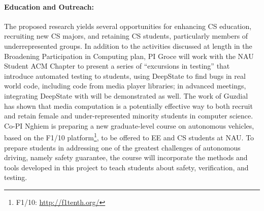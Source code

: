 \paragraph{Education and Outreach:}
The proposed research yields several opportunities for enhancing CS
education, recruiting new CS majors, and retaining CS students,
particularly members of underrepresented groups.  In addition to the
activities discussed at length in the Broadening Participation in Computing plan,
PI Groce will work with the NAU Student ACM Chapter to present a
series of ``excursions in testing'' that introduce automated testing
to students, using DeepState to find bugs in real world code, including code from
media player libraries; in advanced meetings, integrating DeepState
with \framac will be demonstrated as well.  The work of Guzdial
\cite{Guzdial} has shown that media computation is a
potentially effective way to both recruit and retain female and
under-represented minority students in computer science.
Co-PI Nghiem is preparing a new graduate-level course on autonomous vehicles, based on the F1/10 platform\footnote{F1/10: \url{http://f1tenth.org/}}, to be offered to EE and CS students at NAU.
To prepare students in addressing one of the greatest challenges of autonomous driving, namely safety guarantee, the course will incorporate the methods and tools developed in this project to teach students about safety, verification, and testing.


